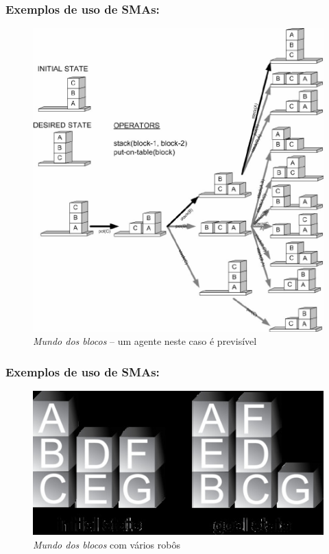 
\begin{frame} %

  \frametitle{Exemplos de uso de SMAs:}
        
\begin{figure}[!ht]
\centering
\includegraphics[height =.6\textheight,width=.7\textwidth]{figuras/original_example_SMAs01.jpg}
\caption{\textit{Mundo dos blocos} -- um agente neste caso é previsível}
\end{figure}
    
\end{frame}


\begin{frame} %

  \frametitle{Exemplos de uso de SMAs:}
        
\begin{figure}[!ht]
\centering
\includegraphics[height =.5\textheight,width=.7\textwidth]{figuras/example_SMAs01.jpg}
\caption{\textit{Mundo dos blocos} com vários robôs}
\end{figure}
    
\end{frame}

